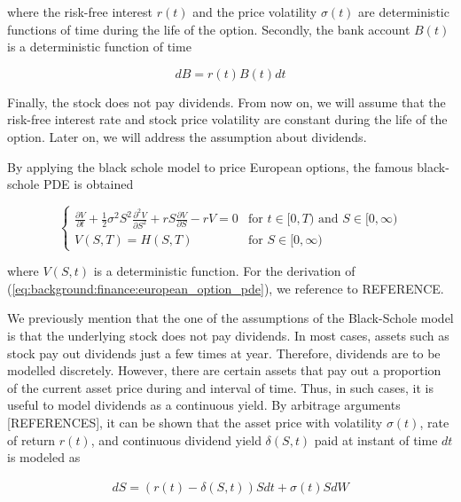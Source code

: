 where the risk-free interest $r(t)$ and the price volatility $\sigma(t)$ are 
deterministic functions of time during the life of the option. Secondly, the 
bank account $B(t)$ is a deterministic function of time

\begin{equation}
  dB = r(t)B(t)dt
\end{equation}

Finally, the stock does not pay dividends. From now on, we will assume that 
the risk-free interest rate and stock price volatility are constant during the 
life of the option. Later on, we will address the assumption about dividends.

By applying the black schole model to price European options, the famous black-schole 
PDE is obtained

\begin{equation}
  \begin{cases}
    \frac{\partial{V}}{\partial{t}} + \frac{1}{2}\sigma^{2} S^2 \frac{\partial^2{V}}{\partial{S^2}} + r S \frac{\partial{V}}{\partial{S}} - rV = 0 & \text{for $t\in[0,T)$ and $S\in[0, \infty)$} \\
    V(S, T) = H(S, T) & \text{for $S\in[0, \infty)$}
  \end{cases}
  \label{eq:background:finance:european_option_pde}
\end{equation}

where $V(S, t)$ is a deterministic function. For the derivation of 
(\ref{eq:background:finance:european_option_pde}), we reference to REFERENCE.

We previously mention that the one of the assumptions of the Black-Schole model is
that the underlying stock does not pay dividends. In most cases, assets such as stock
pay out dividends just a few times at year. Therefore, dividends are to be 
modelled discretely. However, there are certain assets that pay out a proportion
of the current asset price during and interval of time. Thus, in such cases, it is
useful to model dividends as a continuous yield. By arbitrage arguments [REFERENCES], it can be shown that the asset price with volatility $\sigma(t)$, rate of return $r(t)$,
and continuous dividend yield $\delta(S,t)$ paid at instant of time $dt$ is modeled as

\begin{align}
  dS = (r(t) - \delta(S, t))Sdt + \sigma(t) S dW
  \label{eq:background:finance:bs_price_model_with_dividends}
\end{align}

